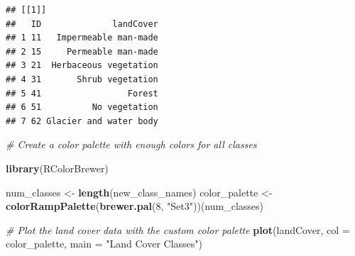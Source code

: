 \documentclass[
]{article}
\newenvironment{Shaded}{\begin{snugshade}}{\end{snugshade}}
\newcommand{\AttributeTok}[1]{\textcolor[rgb]{0.13,0.29,0.53}{#1}}
\newcommand{\CommentTok}[1]{\textcolor[rgb]{0.56,0.35,0.01}{\textit{#1}}}
\newcommand{\DecValTok}[1]{\textcolor[rgb]{0.00,0.00,0.81}{#1}}
\newcommand{\FunctionTok}[1]{\textcolor[rgb]{0.13,0.29,0.53}{\textbf{#1}}}
\newcommand{\NormalTok}[1]{#1}
\newcommand{\OtherTok}[1]{\textcolor[rgb]{0.56,0.35,0.01}{#1}}
\newcommand{\SpecialCharTok}[1]{\textcolor[rgb]{0.81,0.36,0.00}{\textbf{#1}}}
\newcommand{\StringTok}[1]{\textcolor[rgb]{0.31,0.60,0.02}{#1}}
\begin{document}
\begin{Shaded}
\end{Shaded}

\begin{verbatim}
## [[1]]
##   ID              landCover
## 1 11   Impermeable man-made
## 2 15     Permeable man-made
## 3 21  Herbaceous vegetation
## 4 31       Shrub vegetation
## 5 41                 Forest
## 6 51          No vegetation
## 7 62 Glacier and water body
\end{verbatim}

\begin{Shaded}
\begin{Highlighting}[]
\CommentTok{\# Create a color palette with enough colors for all classes}

\FunctionTok{library}\NormalTok{(RColorBrewer)}

\NormalTok{num\_classes }\OtherTok{\textless{}{-}} \FunctionTok{length}\NormalTok{(new\_class\_names)}
\NormalTok{color\_palette }\OtherTok{\textless{}{-}} \FunctionTok{colorRampPalette}\NormalTok{(}\FunctionTok{brewer.pal}\NormalTok{(}\DecValTok{8}\NormalTok{, }\StringTok{"Set3"}\NormalTok{))(num\_classes)}

\CommentTok{\# Plot the land cover data with the custom color palette}
\FunctionTok{plot}\NormalTok{(landCover, }\AttributeTok{col =}\NormalTok{ color\_palette, }\AttributeTok{main =} \StringTok{"Land Cover Classes"}\NormalTok{)}
\end{Highlighting}
\end{Shaded}
\end{document}
